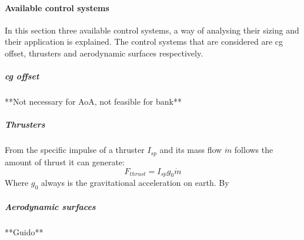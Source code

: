 \paragraph{Available control systems}
\label{control:system}
In this section three available control systems, a way of analysing their sizing and their application is explained. The control systems that are considered are \gls{cg} offset, thrusters and aerodynamic surfaces respectively.

\subparagraph{\acrfull{cg} offset}

**Not necessary for AoA, not feasible for bank**

\subparagraph{Thrusters}
From the specific impulse of a thruster $I_{sp}$ and its mass flow $\dot{m}$ follows the amount of thrust it can generate:
\begin{equation}
F_{thrust}=I_{sp}g_{0}\dot{m}
\end{equation}
Where $g_{0}$ always is the gravitational acceleration on earth. By 
\subparagraph{Aerodynamic surfaces}

**Guido**



